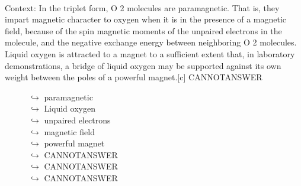 \documentclass[11pt,a4paper, onecolumn]{article}
\begin{document}
\\ Context: In the triplet form, O
2 molecules are paramagnetic. That is, they impart magnetic character to oxygen when it is in the presence of a magnetic field, because of the spin magnetic moments of the unpaired electrons in the molecule, and the negative exchange energy between neighboring O
2 molecules. Liquid oxygen is attracted to a magnet to a sufficient extent that, in laboratory demonstrations, a bridge of liquid oxygen may be supported against its own weight between the poles of a powerful magnet.[c] CANNOTANSWER

\begin{figure}[t] \small \begin{tcolorbox}[boxsep=0pt,left=5pt,right=0pt,top=2pt,colback = yellow!5] \begin{dialogue}
 \small 
\colorbox{pink!25}{$\hookrightarrow$}
{ paramagnetic }
\\
\colorbox{pink!25}{$\hookrightarrow$}
{ Liquid oxygen }
\\
\colorbox{pink!25}{$\hookrightarrow$}
{ unpaired electrons }
\\
\colorbox{pink!25}{$\hookrightarrow$}
{ magnetic field }
\\
\colorbox{pink!25}{$\hookrightarrow$}
{ powerful magnet }
\\
\colorbox{pink!25}{$\hookrightarrow$}
{ CANNOTANSWER }
\\
\colorbox{pink!25}{$\hookrightarrow$}
{ CANNOTANSWER }
\\
\colorbox{pink!25}{$\hookrightarrow$}
{ CANNOTANSWER }
 \end{dialogue}\end{tcolorbox}\end{figure}
\end{document}
